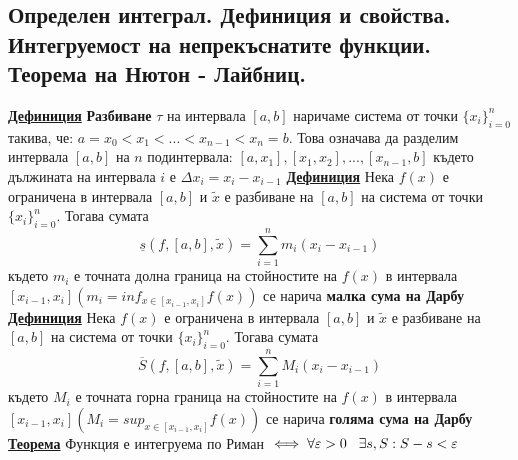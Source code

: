 \documentclass{article}
\begin{document}
\subsection*{Определен интеграл. Дефиниция и свойства. Интегруемост на непрекъснатите функции. 
Теорема на Нютон - Лайбниц.}
\textbf{\underline{Дефиниция}}
\textbf{Разбиване} $\tau$ на интервала $[a, b]$ наричаме система от точки $\{x_i\}_{i = 0}^n$ такива, че: $a = x_0 < x_1 < ... <
x_{n - 1} < x_n = b$. Това означава да разделим интервала $[a, b]$ на $n$ подинтервала: $[a, x_1], [x_1, x_2], ..., [x_{n - 1}, b]$
където дължината на интервала $i$ е $\Delta x_i = x_i - x_{i - 1}$ \newline\newline
\textbf{\underline{Дефиниция}}
Нека $f(x)$ е ограничена в интервала $[a, b]$ и $\widetilde{x}$ е разбиване на $[a, b]$ на система от точки $\{x_i\}_{i = 0}^n$.
Тогава сумата $$\underline{s}(f, [a, b], \widetilde{x}) = \sum_{i = 1}^{n}m_i(x_i - x_{i - 1})$$ където $m_i$ е точната долна
граница на стойностите на $f(x)$ в интервала $[x_{i - 1}, x_i](m_i = inf_{x \in [x_{i - 1}, x_i]}f(x))$ се нарича \textbf{малка
сума на Дарбу} \newline\newline
\textbf{\underline{Дефиниция}}
Нека $f(x)$ е ограничена в интервала $[a, b]$ и $\widetilde{x}$ е разбиване на $[a, b]$ на система от точки $\{x_i\}_{i = 0}^n$.
Тогава сумата $$\overline{S}(f, [a, b], \widetilde{x}) = \sum_{i = 1}^{n}M_i(x_i - x_{i - 1})$$ където $M_i$ е точната горна
граница на стойностите на $f(x)$ в интервала $[x_{i - 1}, x_i](M_i = sup_{x \in [x_{i - 1}, x_i]}f(x))$ се нарича \textbf{голяма
сума на Дарбу} \newline\newline
\textbf{\underline{Теорема}} \newline
Функция е интегруема по Риман $\iff \forall \varepsilon > 0 \hspace{0.3cm} \exists s, S : S - s < \varepsilon$
\end{document}
